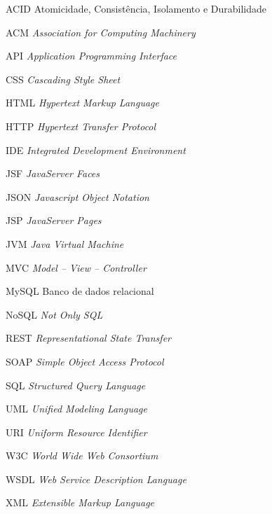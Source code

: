 
\begin{SingleSpace}

\begin{siglas}
\item[ACID]  Atomicidade, Consistência, Isolamento e Durabilidade
\item[ACM]   \textit{Association for Computing Machinery}
\item[API]   \textit{Application Programming Interface}
\item[CSS]	 \textit{Cascading Style Sheet}
\item[HTML]	 \textit{Hypertext Markup Language}
\item[HTTP]  \textit{Hypertext Transfer Protocol}
\item[IDE]	 \textit{Integrated Development Environment}
\item[JSF]   \textit{JavaServer Faces}
\item[JSON]	 \textit{Javascript Object Notation}
\item[JSP]   \textit{JavaServer Pages}
\item[JVM]   \textit{Java Virtual Machine}
\item[MVC]   \textit{Model -- View -- Controller}
\item[MySQL] Banco de dados relacional
\item[NoSQL] \textit{Not Only SQL}
\item[REST]  \textit{Representational State Transfer}
\item[SOAP]	 \textit{Simple Object Access Protocol}
\item[SQL]   \textit{Structured Query Language}
\item[UML]   \textit{Unified Modeling Language}
\item[URI]   \textit{Uniform Resource Identifier}
\item[W3C]   \textit{World Wide Web Consortium}
\item[WSDL]  \textit{Web Service Description Language}
\item[XML]   \textit{Extensible Markup Language}

\end{siglas}

\end{SingleSpace}
